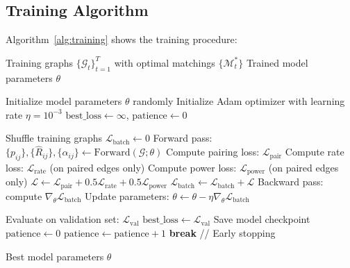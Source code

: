 \subsection{Training Algorithm}

Algorithm~\ref{alg:training} shows the training procedure:

\begin{algorithm}[H]
\caption{NOMA-GNN Training}
\label{alg:training}
\begin{algorithmic}[1]
\Require Training graphs $\{\mathcal{G}_t\}_{t=1}^T$ with optimal matchings $\{\mathcal{M}_t^*\}$
\Ensure Trained model parameters $\theta$

\State Initialize model parameters $\theta$ randomly
\State Initialize Adam optimizer with learning rate $\eta = 10^{-3}$
\State $\text{best\_loss} \leftarrow \infty$, $\text{patience} \leftarrow 0$

    \State Shuffle training graphs
        \State $\mathcal{L}_{\text{batch}} \leftarrow 0$
            \State Forward pass: $\{p_{ij}\}, \{\hat{R}_{ij}\}, \{\alpha_{ij}\} \leftarrow \text{Forward}(\mathcal{G}; \theta)$
            \State Compute pairing loss: $\mathcal{L}_{\text{pair}}$
            \State Compute rate loss: $\mathcal{L}_{\text{rate}}$ (on paired edges only)
            \State Compute power loss: $\mathcal{L}_{\text{power}}$ (on paired edges only)
            \State $\mathcal{L} \leftarrow \mathcal{L}_{\text{pair}} + 0.5 \mathcal{L}_{\text{rate}} + 0.5 \mathcal{L}_{\text{power}}$
            \State $\mathcal{L}_{\text{batch}} \leftarrow \mathcal{L}_{\text{batch}} + \mathcal{L}$
        \EndFor
        \State Backward pass: compute $\nabla_\theta \mathcal{L}_{\text{batch}}$
        \State Update parameters: $\theta \leftarrow \theta - \eta \nabla_\theta \mathcal{L}_{\text{batch}}$
    \EndFor
    
    \State Evaluate on validation set: $\mathcal{L}_{\text{val}}$
        \State $\text{best\_loss} \leftarrow \mathcal{L}_{\text{val}}$
        \State Save model checkpoint
        \State $\text{patience} \leftarrow 0$
    \Else
        \State $\text{patience} \leftarrow \text{patience} + 1$
            \State \textbf{break} \quad // Early stopping
        \EndIf
    \EndIf
\EndFor

\State \Return Best model parameters $\theta$
\end{algorithmic}
\end{algorithm}

